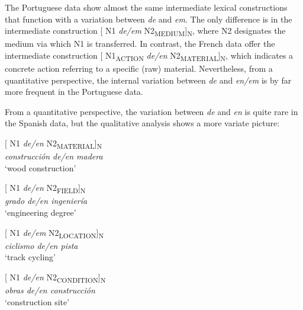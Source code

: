 \documentclass[output=paper]{langsci/langscibook}
\begin{document}
The Portuguese data show almost the same intermediate lexical constructions that function with a variation between \textit{de} and \textit{em}. The only difference is in the intermediate construction [ N1 \textit{de/em} N2\textsubscript{MEDIUM}]\textsubscript{N}, where N2 designates the medium via which N1 is transferred. In contrast, the French data offer the intermediate construction [ N1\textsubscript{ACTION} \textit{de/en} N2\textsubscript{MATERIAL}]\textsubscript{N}, which indicates a concrete action referring to a specific (raw) material. Nevertheless, from a quantitative perspective, the internal variation between \textit{de} and \textit{en/em} is by far more frequent in the Portuguese data.

 From a quantitative perspective, the variation between \textit{de} and \textit{en} is quite rare in the Spanish data, but the qualitative analysis shows a more variate picture:

\begin{exe}\ex\begin{minipage}[t]{0.4\textwidth}    %
[ N1 \textit{de/en} N2\textsubscript{MATERIAL}]\textsubscript{N}\\
\textit{construcción de/en madera }\\
`wood construction'
\end{minipage}\hfill%
\begin{minipage}[t]{0.45\textwidth}
[ N1 \textit{de/en} N2\textsubscript{FIELD}]\textsubscript{N}\\
\textit{grado de/en ingeniería}\\
`engineering degree'
\end{minipage}
\end{exe}

\begin{exe}\ex\begin{minipage}[t]{0.4\textwidth}    %
[ N1 \textit{de/em} N2\textsubscript{LOCATION}]\textsubscript{N}\\
\textit{ciclismo de/en pista}\\
`track cycling'
\end{minipage}\hfill%
\begin{minipage}[t]{0.45\textwidth}
[ N1 \textit{de/en} N2\textsubscript{CONDITION}]\textsubscript{N}\\
\textit{obras de/en construcción}\\
`construction site'
\end{minipage}\end{exe}
\end{document}
